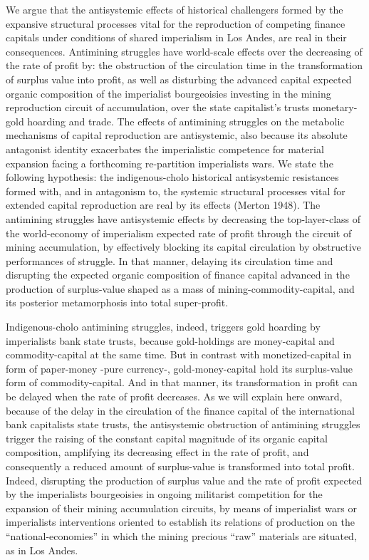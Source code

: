 \documentclass[]{interact}
\theoremstyle{plain}%
\theoremstyle{definition}
\theoremstyle{remark}
\begin{document}
We argue that the antisystemic effects of historical challengers formed by the expansive structural processes vital for the reproduction of competing finance capitals under conditions of shared imperialism in Los Andes, are real in their consequences. Antimining struggles have world-scale effects over the decreasing of the rate of profit by: the obstruction of the circulation time in the transformation of surplus value into profit, as well as disturbing the advanced capital expected organic composition of the imperialist bourgeoisies investing in the mining reproduction circuit of accumulation, over the state capitalist’s trusts monetary-gold hoarding and trade. The effects of antimining struggles on the metabolic mechanisms of capital reproduction are antisystemic, also because its absolute antagonist identity exacerbates the imperialistic competence for material expansion facing a forthcoming re-partition imperialists wars.
We state the following hypothesis: the indigenous-cholo historical antisystemic resistances formed with, and in antagonism to, the systemic structural processes vital for extended capital reproduction are real by its effects (Merton 1948). The antimining struggles have antisystemic effects by decreasing the top-layer-class of the world-economy of imperialism expected rate of profit through the circuit of mining accumulation, by effectively blocking its capital circulation by obstructive performances of struggle. In that manner, delaying its circulation time and disrupting the expected organic composition of finance capital advanced in the production of surplus-value shaped as a mass of mining-commodity-capital, and its posterior metamorphosis into total super-profit.

Indigenous-cholo antimining struggles, indeed, triggers gold hoarding by imperialists bank state trusts, because gold-holdings are money-capital and commodity-capital at the same time. But in contrast with monetized-capital in form of paper-money -pure currency-, gold-money-capital hold its surplus-value form of commodity-capital. And in that manner, its transformation in profit can be delayed when the rate of profit decreases. As we will explain here onward, because of the delay in the circulation of the finance capital of the international bank capitalists state trusts, the antisystemic obstruction of antimining struggles trigger the raising of the constant capital magnitude of its organic capital composition, amplifying its decreasing effect in the rate of profit, and consequently a reduced amount of surplus-value is transformed into total profit. Indeed, disrupting the production of surplus value and the rate of profit expected by the imperialists bourgeoisies in ongoing militarist competition for the expansion of their mining accumulation circuits, by means of imperialist wars or imperialists interventions oriented to establish its relations of production on the “national-economies” in which the mining precious “raw” materials are situated, as in Los Andes.
\end{document}
